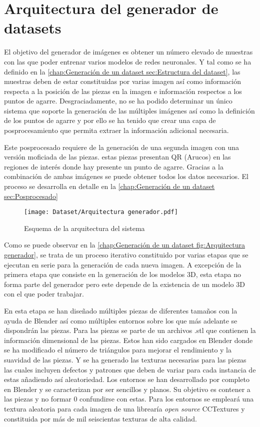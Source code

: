 \section{Arquitectura del generador de datasets}	
\label{chap:Generación de un dataset sec:Arquitectura del generador de imágenes}
El objetivo del generador de imágenes es obtener un número elevado de muestras con las que poder entrenar varios modelos de redes neuronales. Y tal como se ha definido en la \autoref{chap:Generación de un dataset sec:Estructura del dataset}, las muestras deben de estar constituidas por varias imagen así como información respecta a la posición de las piezas en la imagen e información respectos a los puntos de agarre. Desgraciadamente, no se ha podido determinar un único sistema que soporte la generación de las múltiples imágenes así como la definición de los puntos de agarre y por ello se ha tenido que crear una capa de posprocesamiento que permita extraer la información adicional necesaria.

Este posprocesado requiere de la generación de una segunda imagen con una versión moficiada de las piezas. estas piezas presentan QR (Arucos) en las regiones de interés donde hay presente un punto de agarre. Gracias a la combinación de ambas imágenes se puede obtener todos los datos necesarios. El proceso se desarrolla en detalle en la \autoref{chap:Generación de un dataset sec:Posprocesado}

\begin{figure}[ht]
	\centering
	\texttt{[image: Dataset/Arquitectura generador.pdf]}
	\caption{Esquema de la arquitectura del sistema}
	\label{chap:Generación de un dataset fig:Arquitectura generador}
	\vspace{-5pt}
\end{figure}

Como se puede observar en la \autoref{chap:Generación de un dataset fig:Arquitectura generador}, se trata de un proceso iterativo constituido por varias etapas que se ejecutan en serie para la generación de cada nueva imagen. A excepción de la primera etapa que consiste en la generación de los modelos 3D, esta etapa no forma parte del generador pero este depende de la existencia de un modelo 3D con el que poder trabajar.

En esta etapa se han diseñado múltiples piezas de diferentes tamaños con la ayuda de Blender así como múltiples entornos sobre los que más adelante se dispondrán las piezas. Para las piezas se parte de un archivos .stl que contienen la información dimensional de las piezas. Estos han sido cargados en Blender donde se ha modificado el número de triángulos para mejorar el rendimiento y la suavidad de las piezas. Y se ha generado las texturas necesarias para las piezas las cuales incluyen defectos y patrones que deben de variar para cada instancia de estas añadiendo así aleatoriedad. Los entornos se han desarrollado por completo en Blender y se caracterizan por ser sencillos y planos. Su objetivo es contener a las piezas y no formar 0 confundirse con estas. Para los entornos se empleará una textura aleatoria para cada imagen de una librearía \textit{open source} CCTextures y constituida por más de mil seiscientas texturas de alta calidad.

